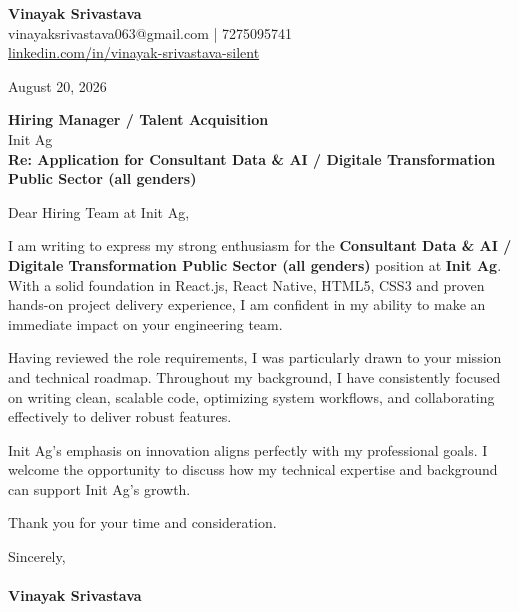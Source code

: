 \documentclass[11pt,a4paper]{article}
\begin{document}
\thispagestyle{empty}

{\Large \textbf{Vinayak Srivastava}}\\
vinayaksrivastava063@gmail.com | 7275095741 \\
\url{linkedin.com/in/vinayak-srivastava-silent}

\vspace{1em}
\hfill August 20, 2026

\textbf{Hiring Manager / Talent Acquisition}\\
Init Ag\\

\vspace{1.5em}
\textbf{Re: Application for Consultant Data & AI / Digitale Transformation Public Sector (all genders)}

\vspace{1em}
Dear Hiring Team at Init Ag,

I am writing to express my strong enthusiasm for the \textbf{Consultant Data & AI / Digitale Transformation Public Sector (all genders)} position at \textbf{Init Ag}. With a solid foundation in React.js, React Native, HTML5, CSS3 and proven hands-on project delivery experience, I am confident in my ability to make an immediate impact on your engineering team.

Having reviewed the role requirements, I was particularly drawn to your mission and technical roadmap. Throughout my background, I have consistently focused on writing clean, scalable code, optimizing system workflows, and collaborating effectively to deliver robust features.

Init Ag's emphasis on innovation aligns perfectly with my professional goals. I welcome the opportunity to discuss how my technical expertise and background can support Init Ag's growth.

Thank you for your time and consideration.

\vspace{1.5em}
Sincerely,\\
\vspace{1em}\\
\textbf{Vinayak Srivastava}
\end{document}
